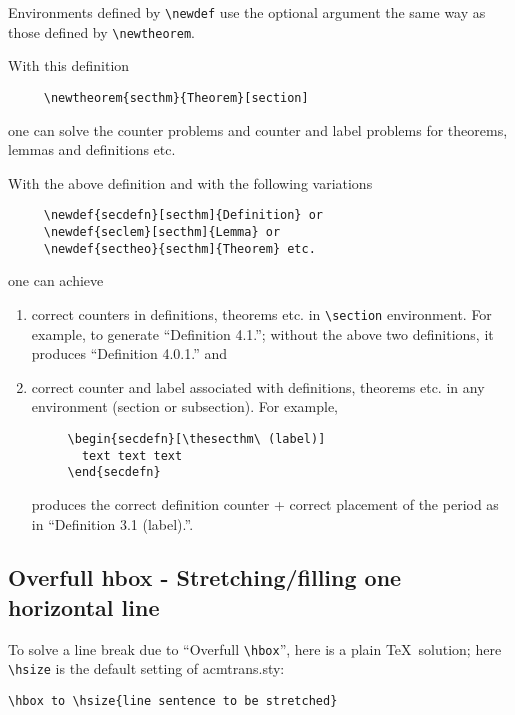 \documentclass[hyperref]{acmtrans2e}
\begin{document}
Environments defined by \verb|\newdef| use the optional
argument the same way as those defined by \verb|\newtheorem|.

\vskip10pt
With this definition

\begin{verbatim}
     \newtheorem{secthm}{Theorem}[section]
\end{verbatim}
\noindent
one can solve the counter problems and counter and label problems for
theorems, lemmas and definitions etc.

With the above definition and with the following variations
\begin{verbatim}
     \newdef{secdefn}[secthm]{Definition} or
     \newdef{seclem}[secthm]{Lemma} or
     \newdef{sectheo}{secthm]{Theorem} etc.
\end{verbatim}
\noindent
one can achieve
\begin{enumerate} 
\item correct counters in definitions, theorems etc. in \verb|\section| environment.
For example, to generate ``Definition 4.1.''; without the above two definitions, it produces ``Definition 4.0.1.'' and
\item correct counter and label associated with definitions, theorems etc. in any environment (section or subsection). For example, 
\begin{verbatim}
     \begin{secdefn}[\thesecthm\ (label)] 
       text text text
     \end{secdefn}
\end{verbatim}
produces the correct definition counter + correct placement of the period as in
``Definition 3.1 (label).''.
\end{enumerate}

\subsection{Overfull hbox - Stretching/filling one horizontal line}

To solve a line break due to ``Overfull \verb|\hbox|'', here is a plain \TeX\ 
solution; here \verb|\hsize| is the default setting of acmtrans.sty:

\begin{center}
\verb|\hbox to \hsize{line sentence to be stretched}|
\end{center}
\end{document}
